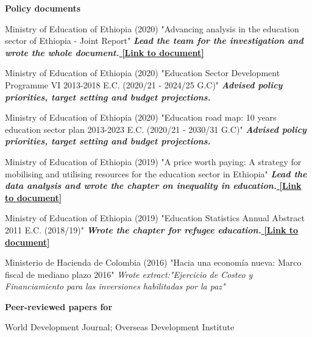 \documentclass[letterpaper]{article}
\renewenvironment{itemize}{
  \begin{list}{}{
    \setlength{\leftmargin}{1.5em}
  }
}{
  \end{list}
}
\begin{document}
\textbf{Policy documents}
\begin{itemize}
\item Ministry of Education of Ethiopia (2020) "Advancing analysis in the education sector of Ethiopia - Joint Report" \textit{\textbf{Lead the team for the investigation and wrote the whole document.}}\href{https://1drv.ms/b/s!AiJLsCu4Hb4HgP9m8rhHfGhE3KNzlg?e=Q1d2oZ}{\textbf{ [Link to document]}}
\item Ministry of Education of Ethiopia (2020) "Education Sector Development Programme VI 2013-2018 E.C. (2020/21 - 2024/25 G.C)" \textit{\textbf{Advised policy priorities, target setting and budget projections.}}
\item Ministry of Education of Ethiopia (2020) "Education road map: 10 years education sector plan 2013-2023 E.C. (2020/21 - 2030/31 G.C)" \textit{\textbf{Advised policy priorities, target setting and budget projections.}} 
\item Ministry of Education of Ethiopia (2019) "A price worth paying: A strategy for mobilising and utilising resources for the education sector in Ethiopia" \textit{\textbf{Lead the data analysis and wrote the chapter on inequality in education.}}\href{https://1drv.ms/b/s!AiJLsCu4Hb4HgP9lYxHTaJhHgW-G5A?e=kBhZTA}{\textbf{ [Link to document]}}
\item Ministry of Education of Ethiopia (2019) "Education Statistics Annual Abstract 2011 E.C. (2018/19)" \textit{\textbf{Wrote the chapter for refugee education.}}\href{https://1drv.ms/b/s!AiJLsCu4Hb4HgP9n7Y4F9EEaC9XBWg?e=XKecjD}{\textbf{ [Link to document]}}

Ministerio de Hacienda de Colombia (2016) "Hacia una econom\'ia nueva: Marco fiscal de mediano plazo 2016" \textit{Wrote extract:"Ejercicio de Costeo y Financiamiento para las inversiones habilitadas por la paz"}
\end{itemize}

\textbf{Peer-reviewed papers for}
\begin{itemize}
\item World Development Journal; Overseas Development Institute
\end{itemize}

\end{document}
